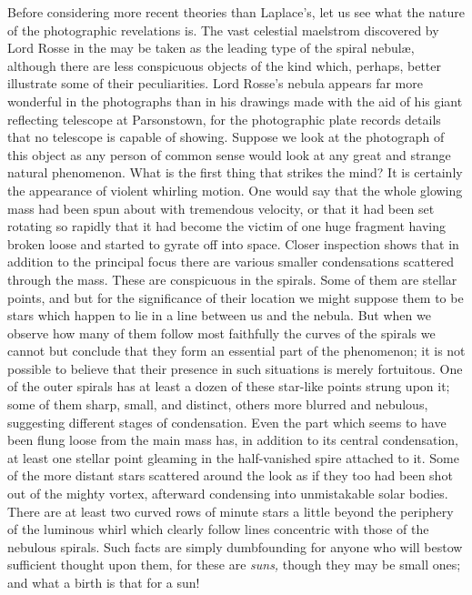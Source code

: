 Before considering more recent theories than La\-place's, let us see
what the nature of the photographic revelations is. The vast celestial
maelstrom discovered by Lord Rosse in the  may be
taken as the leading type of the spiral nebul{\ae}, although there are
less conspicuous objects of the kind which, perhaps, better illustrate
some of their peculiarities. Lord Rosse's nebula appears far more
wonderful in the photographs than in his drawings made with the aid of
his giant reflecting telescope at Parsonstown, for the photographic
plate records details that no telescope is capable of showing. Suppose
we look at the photograph of this object as any person of common sense
would look at any great and strange natural phenomenon. What is the
first thing that strikes the mind? It is certainly the appearance of
violent whirling motion. One would say that the whole glowing mass had
been spun about with tremendous velocity, or that it had been set
rotating so rapidly that it had become the victim of
 one huge fragment having broken loose and
started to gyrate off into space. Closer inspection shows that in
addition to the principal focus there are various smaller
condensations scattered through the mass. These are conspicuous in the
spirals. Some of them are stellar points, and but for the significance
of their location we might suppose them to be stars which happen to
lie in a line between us and the nebula. But when we observe how many
of them follow most faithfully the curves of the spirals we cannot but
conclude that they form an essential part of the phenomenon; it is not
possible to believe that their presence in such situations is merely
fortuitous. One of the outer spirals has at least a dozen of these
star-like points strung upon it; some of them sharp, small, and
distinct, others more blurred and nebulous, suggesting different
stages of condensation. Even the part which seems to have been flung
loose from the main mass has, in addition to its central condensation,
at least one stellar point gleaming in the half-vanished spire
attached to it. Some of the more distant stars scattered around the
 look as if they too had been shot out of the mighty
vortex, afterward condensing into unmistakable solar bodies. There are
at least two curved rows of minute stars a little beyond the periphery
of the luminous whirl which clearly follow lines concentric with those
of the nebulous spirals. Such facts are simply dumbfounding for anyone
who will bestow sufficient thought upon them, for these are {\em
suns,} though they may be small ones; and what a birth is that for a
sun!

